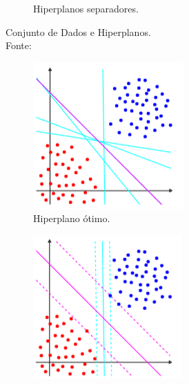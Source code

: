\documentclass[12pt,a4paper]{scrartcl}
\theoremstyle{definition}%
\begin{document}
\begin{figure}[htbp]
\begin{subfigure}[h]{0.38\textwidth}
		\caption{Hiperplanos separadores. \label{fig2:b}}
	\end{subfigure}
\caption{Conjunto de Dados e Hiperplanos. \label{fig2}
	\\ Fonte: \textcite{Evelin2017}}
\end{figure}
\begin{figure}[hbtp] 
	\centering
	\begin{subfigure}[h]{0.38\textwidth}
		\centering
		\includegraphics[width=\textwidth]{hiperplano_otimo}
		\caption{Hiperplano ótimo. \label{fig3:a}}
	\end{subfigure}
	\begin{subfigure}[h]{0.38\textwidth}
		\centering
		\includegraphics[width=\textwidth]{maxima_margem}

\end{subfigure}
\end{figure}
\end{document}
